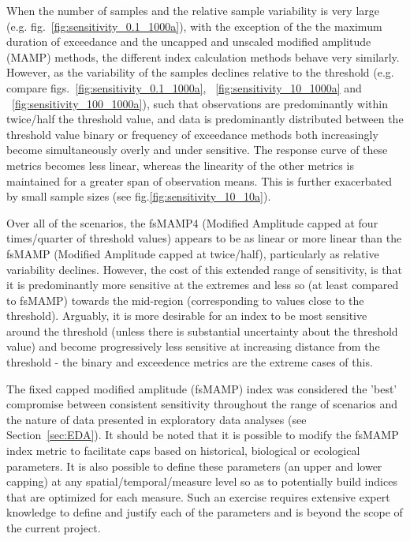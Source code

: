 When the number of samples and the relative sample variability is very large
(e.g. fig.~\ref{fig:sensitivity_0.1_1000a}), with the exception of the the maximum duration of
exceedance and the uncapped and unscaled modified amplitude (MAMP) methods, the different index
calculation methods behave very similarly.  However, as the variability of the samples declines
relative to the threshold (e.g. compare figs.~\ref{fig:sensitivity_0.1_1000a},
~\ref{fig:sensitivity_10_1000a} and ~\ref{fig:sensitivity_100_1000a}), such that observations are
predominantly within twice/half the threshold value, %
and data is predominantly distributed between the threshold value %
binary or frequency of exceedance methods both increasingly become simultaneously overly and under
sensitive.  The response curve of these metrics becomes less linear, whereas the linearity of the
other metrics is maintained for a greater span of observation means.  This is further exacerbated by
small sample sizes (see fig.\ref{fig:sensitivity_10_10a}).

Over all of the scenarios, the fsMAMP4 (Modified Amplitude capped at four times/quarter of threshold
values) appears to be as linear or more linear than the fsMAMP (Modified Amplitude capped at
twice/half), particularly as relative variability declines.  However, the cost of this extended
range of sensitivity, is that it is predominantly more sensitive at the extremes and less so (at
least compared to fsMAMP) towards the mid-region (corresponding to values close to the threshold).
Arguably, it is more desirable for an index to be most sensitive around the threshold (unless there
is substantial uncertainty about the threshold value) and become progressively less sensitive at
increasing distance from the threshold - the binary and exceedence metrics are the extreme cases of
this.


The fixed capped modified amplitude (fsMAMP) index was considered the 'best' compromise between
consistent sensitivity throughout the range of scenarios and the nature of data presented in
exploratory data analyses (see Section~\ref{sec:EDA}).  It should be noted that it is possible to
modify the fsMAMP index metric to facilitate caps based on historical, biological or ecological
parameters.  It is also possible to define these parameters (an upper and lower capping) at any
spatial/temporal/measure level so as to potentially build indices that are optimized for each
measure.  Such an exercise requires extensive expert knowledge to define and justify each of the
parameters and is beyond the scope of the current project.


